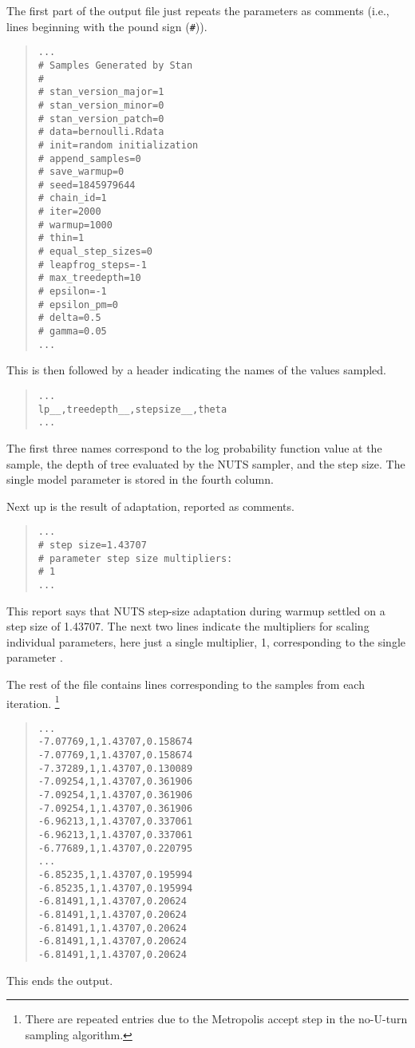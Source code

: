 The first part of the output file just repeats the parameters
as comments (i.e., lines beginning with the pound sign (\Verb|#|)).
%
\begin{quote}
\begin{Verbatim}
...
# Samples Generated by Stan
#
# stan_version_major=1
# stan_version_minor=0
# stan_version_patch=0
# data=bernoulli.Rdata
# init=random initialization
# append_samples=0
# save_warmup=0
# seed=1845979644
# chain_id=1
# iter=2000
# warmup=1000
# thin=1
# equal_step_sizes=0
# leapfrog_steps=-1
# max_treedepth=10
# epsilon=-1
# epsilon_pm=0
# delta=0.5
# gamma=0.05
...
\end{Verbatim}
\end{quote}
%
This is then followed by a header indicating the
names of the values sampled.
%
\begin{quote}
\begin{Verbatim}
...
lp__,treedepth__,stepsize__,theta
...
\end{Verbatim}
\end{quote}
%
The first three names correspond to the log probability function
value at the sample, the depth of tree evaluated by the NUTS sampler,
and the step size.  The single model parameter  is
stored in the fourth column.

Next up is the result of adaptation, reported as comments.
%
\begin{quote}
\begin{Verbatim}
...
# step size=1.43707
# parameter step size multipliers:
# 1
...
\end{Verbatim}
\end{quote}
%
This report says that NUTS step-size adaptation during warmup
settled on a step size of 1.43707.  The next two lines
indicate the multipliers for scaling individual parameters, here
just a single multiplier, 1, corresponding to the single
parameter .

The rest of the file contains lines corresponding to the
samples from each iteration.%
%
\footnote{There are repeated entries due to the Metropolis accept step
in the no-U-turn sampling algorithm.}
%
%
\begin{quote}
\begin{Verbatim}
...
-7.07769,1,1.43707,0.158674
-7.07769,1,1.43707,0.158674
-7.37289,1,1.43707,0.130089
-7.09254,1,1.43707,0.361906
-7.09254,1,1.43707,0.361906
-7.09254,1,1.43707,0.361906
-6.96213,1,1.43707,0.337061
-6.96213,1,1.43707,0.337061
-6.77689,1,1.43707,0.220795
...
-6.85235,1,1.43707,0.195994
-6.85235,1,1.43707,0.195994
-6.81491,1,1.43707,0.20624
-6.81491,1,1.43707,0.20624
-6.81491,1,1.43707,0.20624
-6.81491,1,1.43707,0.20624
-6.81491,1,1.43707,0.20624
\end{Verbatim}
\end{quote}
%
This ends the output.  

